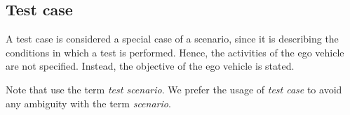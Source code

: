 \subsection{Test case}
\label{sec:test case}

A test case is considered a special case of a scenario, since it is describing the conditions in which a test is performed. Hence, the activities of the ego vehicle are not specified. Instead, the objective of the ego vehicle is stated.

Note that \textcite{stellet2015taxonomy} use the term \emph{test scenario}. We prefer the usage of \emph{test case} to avoid any ambiguity with the term \emph{scenario}.
